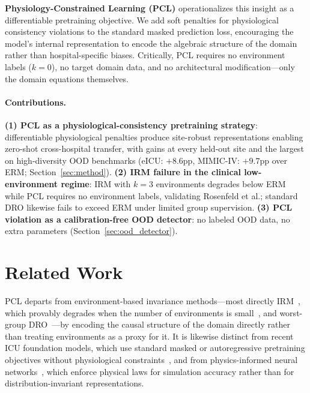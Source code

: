 \documentclass{article}
\begin{document}
\textbf{Physiology-Constrained Learning (PCL)} operationalizes this insight as a differentiable pretraining objective.
We add soft penalties for physiological consistency violations to the standard masked prediction loss, encouraging the model's internal representation to encode the algebraic structure of the domain rather than hospital-specific biases.
Critically, PCL requires no environment labels ($k = 0$), no target domain data, and no architectural modification---only the domain equations themselves.

\paragraph{Contributions.}
\textbf{(1) PCL as a physiological-consistency pretraining strategy}: differentiable physiological penalties produce site-robust representations enabling zero-shot cross-hospital transfer, with gains at every held-out site and the largest on high-diversity OOD benchmarks (eICU: $+8.6$pp, MIMIC-IV: $+9.7$pp over ERM; Section~\ref{sec:method}).
\textbf{(2) IRM failure in the clinical low-environment regime}: IRM with $k{=}3$ environments degrades below ERM while PCL requires no environment labels, validating Rosenfeld et al.; standard DRO likewise fails to exceed ERM under limited group supervision.
\textbf{(3) PCL violation as a calibration-free OOD detector}: no labeled OOD data, no extra parameters (Section~\ref{sec:ood_detector}).

\section{Related Work}
\label{sec:related}

PCL departs from environment-based invariance methods---most directly IRM~\citep{arjovsky2019invariant}, which provably degrades when the number of environments is small~\citep{rosenfeld2021risks}, and worst-group DRO~\citep{sagawa2020distributionally}---by encoding the causal structure of the domain directly rather than treating environments as a proxy for it. It is likewise distinct from recent ICU foundation models, which use standard masked or autoregressive pretraining objectives without physiological constraints~\citep{icarefm2025}, and from physics-informed neural networks~\citep{raissi2019physics}, which enforce physical laws for simulation accuracy rather than for distribution-invariant representations.
\end{document}
